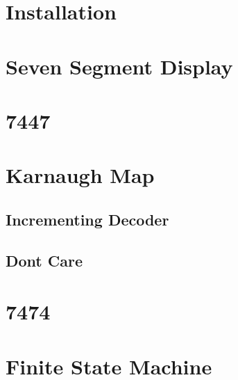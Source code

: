 \documentclass[journal]{IEEEtran}
\begin{document}
\newpage
\onecolumn

\section{Installation}

\newpage
\section{Seven Segment Display}

\newpage
\section{7447}

%
\newpage
\section{Karnaugh Map}
\subsection{ Incrementing Decoder}

\subsection{Dont Care}

%
\newpage
\section{7474}

%
\newpage
\section{Finite State Machine}

%
%
\end{document}
